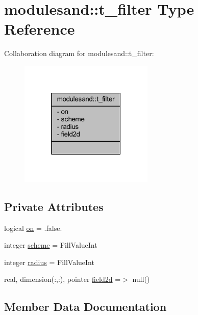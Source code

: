 \hypertarget{structmodulesand_1_1t__filter}{}\section{modulesand\+:\+:t\+\_\+filter Type Reference}
\label{structmodulesand_1_1t__filter}


Collaboration diagram for modulesand\+:\+:t\+\_\+filter\+:\nopagebreak
\begin{figure}[H]
\begin{center}
\leavevmode
\includegraphics[width=181pt]{structmodulesand_1_1t__filter__coll__graph}
\end{center}
\end{figure}
\subsection*{Private Attributes}
\begin{DoxyCompactItemize}
\item 
logical \mbox{\hyperlink{structmodulesand_1_1t__filter_abf7bc03bf559fd253d8533b23bb149f8}{on}} = .false.
\item 
integer \mbox{\hyperlink{structmodulesand_1_1t__filter_a0d7cd90462216463e023dcb30d184f76}{scheme}} = Fill\+Value\+Int
\item 
integer \mbox{\hyperlink{structmodulesand_1_1t__filter_a690feea9de7fdb267dbadceea4f6b8ca}{radius}} = Fill\+Value\+Int
\item 
real, dimension(\+:,\+:), pointer \mbox{\hyperlink{structmodulesand_1_1t__filter_aefcad56a9ec16032905ebaed1ded17de}{field2d}} =$>$ null()
\end{DoxyCompactItemize}


\subsection{Member Data Documentation}
\mbox{\label{structmodulesand_1_1t__filter_aefcad56a9ec16032905ebaed1ded17de}} 
